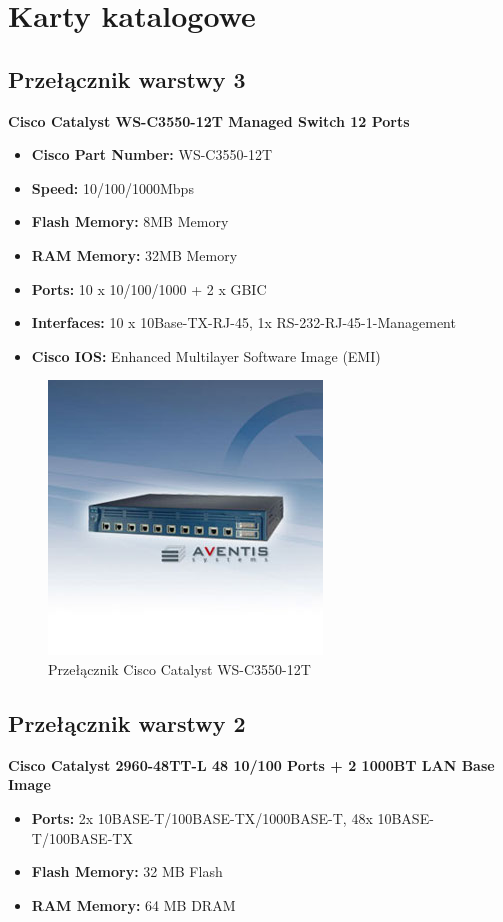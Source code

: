 \newpage
\section{Karty katalogowe}
\subsection{Przełącznik warstwy 3}
\textbf{Cisco Catalyst WS-C3550-12T Managed Switch 12 Ports} 
\begin{itemize}
	\item \textbf{Cisco Part Number:} WS-C3550-12T
	\item \textbf{Speed:} 10/100/1000Mbps
	\item \textbf{Flash Memory:} 8MB Memory
	\item \textbf{RAM Memory:} 32MB Memory
	\item \textbf{Ports:} 10 x 10/100/1000 + 2 x GBIC
	\item \textbf{Interfaces:} 10 x 10Base-TX-RJ-45, 1x RS-232-RJ-45-1-Management
	\item \textbf{Cisco IOS:} Enhanced Multilayer Software Image (EMI)
\end{itemize}

\begin{figure}[htbp]
	\begin{center}
        \includegraphics[scale = 1.0]{img/switchL3.jpg}
        \caption{Przełącznik Cisco Catalyst WS-C3550-12T}
    \end{center}
\end{figure}

 \subsection{Przełącznik warstwy 2}
 \textbf{Cisco Catalyst 2960-48TT-L 48 10/100 Ports + 2 1000BT LAN Base Image}
\begin{itemize}
	\item \textbf{Ports:} 2x 10BASE-T/100BASE-TX/1000BASE-T, 48x 10BASE-T/100BASE-TX
	\item \textbf{Flash Memory:} 32 MB Flash 
	\item \textbf{RAM Memory:} 64 MB DRAM
\end{itemize}

